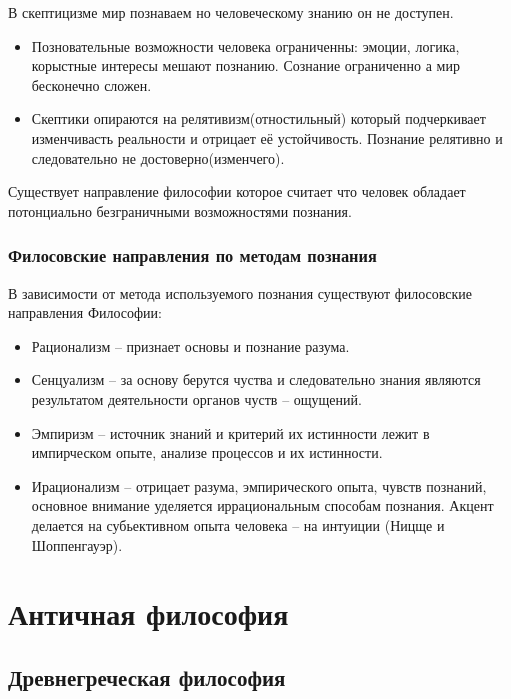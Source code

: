 \documentclass[a4paper, 14pt]{extreport}
\begin{document}
В скептицизме мир познаваем но человеческому знанию он не доступен.

\begin{itemize}

\item
  Позновательные возможности человека ограниченны: эмоции, логика,
  корыстные интересы мешают познанию. Сознание ограниченно а мир
  бесконечно сложен.
\item
  Скептики опираются на релятивизм(отностильный) который подчеркивает
  изменчивасть реальности и отрицает её устойчивость. Познание релятивно
  и следовательно не достоверно(изменчего).
\end{itemize}

Существует направление философии которое считает что человек обладает
потонциально безграничными возможностями познания.

\subsection{Филосовские направления по методам познания}

В зависимости от метода используемого познания существуют филосовские
направления Философии:

\begin{itemize}

\item
  Рационализм -- признает основы и познание разума.
\item
  Сенцуализм -- за основу берутся чуства и следовательно знания являются
  результатом деятельности органов чуств -- ощущений.
\item
  Эмпиризм -- источник знаний и критерий их истинности лежит в
  импирческом опыте, анализе процессов и их истинности.
\item
  Ирационализм -- отрицает разума, эмпирического опыта, чувств познаний,
  основное внимание уделяется иррациональным способам познания. Акцент
  делается на субьективном опыта человека -- на интуиции (Ницще и
  Шоппенгауэр).
\end{itemize}

\chapter{Античная философия}
\section{Древнегреческая философия}
\end{document}
